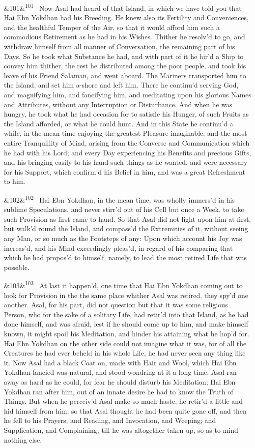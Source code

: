 \documentclass[12pt]{article}
\newcommand{\para}[1][]{\par\noindent\ifx&#1&\else\textsuperscript{\footnotesize #1}~\fi}
\begin{document}
\para[101] Now Asal had heard of that Island, in which we have told you that Hai Ebn Yokdhan had his Breeding. He knew also its Fertility and Conveniences, and the healthful Temper of the Air, so that it would afford him such a commodious Retirement as he had in his Wishes. Thither he resolv'd to go, and withdraw himself from all manner of Conversation, the remaining part of his Days. So he took what Substance he had, and with part of it he hir'd a Ship to convey him thither, the rest he distributed among the poor people, and took his leave of his Friend Salaman, and went aboard. The Mariners transported him to the Island, and set him a-shore and left him. There he continu'd serving God, and magnifying him, and fancifying him, and meditating upon his glorious Names and Attributes, without any Interruption or Disturbance. And when he was hungry, he took what he had occasion for to satisfie his Hunger, of such Fruits as the Island afforded, or what he could hunt. And in this State he continu'd a while, in the mean time enjoying the greatest Pleasure imaginable, and the most entire Tranquillity of Mind, arising from the Converse and Communication which he had with his Lord; and every Day experiencing his Benefits and precious Gifts, and his bringing easily to his hand such things as he wanted, and were necessary for his Support, which confirm'd his Belief in him, and was a great Refreshment to him.

\para[102] Hai Ebn Yokdhan, in the mean time, was wholly immers'd in his sublime Speculations, and never stirr'd out of his Cell but once a Week, to take such Provision as first came to hand. So that Asal did not light upon him at first, but walk'd round the Island, and compass'd the Extremities of it, without seeing any Man, or so much as the Footsteps of any: Upon which account his Joy was increas'd, and his Mind exceedingly pleas'd, in regard of his comparing that which he had propos'd to himself, namely, to lead the most retired Life that was possible.

\para[103] At last it happen'd, one time that Hai Ebn Yokdhan coming out to look for Provision in the the same place whither Asal was retired, they spy'd one another. Asal, for his part, did not question but that it was some religious Person, who for the sake of a solitary Life, had retir'd into that Island, as he had done himself, and was afraid, lest if he should come up to him, and make himself known, it might spoil his Meditation, and hinder his attaining what he hop'd for. Hai Ebn Yokdhan on the other side could not imagine what it was, for of all the Creatures he had ever beheld in his whole Life, he had never seen any thing like it. Now Asal had a black Coat on, made with Hair and Wool, which Hai Ebn Yokdhan fancied was natural, and stood wondring at it a long time. Asal ran away as hard as he could, for fear he should disturb his Meditation; Hai Ebn Yokdhan ran after him, out of an innate desire he had to know the Truth of Things. But when he perceiv'd Asal make so much haste, he retir'd a little and hid himself from him; so that Asal thought he had been quite gone off, and then he fell to his Prayers, and Reading, and Invocation, and Weeping; and Supplication, and Complaining, till he was altogether taken up, so as to mind nothing else.
\end{document}
